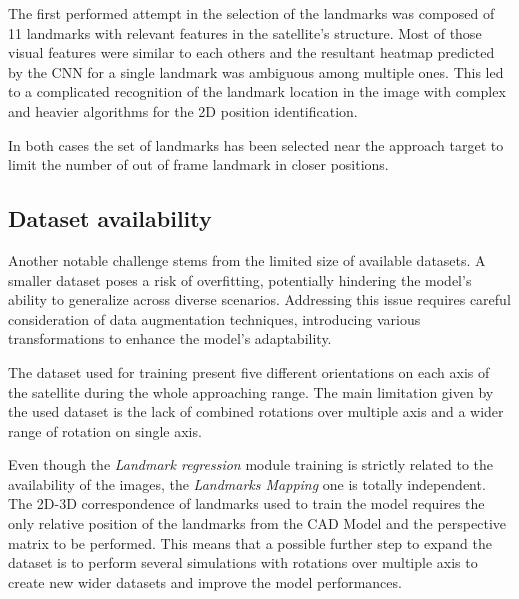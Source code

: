 The first performed attempt in the selection of the landmarks was composed of 11 landmarks with relevant features in the satellite's structure. Most of those visual features were similar to each others and the resultant heatmap predicted by the CNN for a single landmark was ambiguous among multiple ones. This led to a complicated recognition of the landmark location in the image with complex and heavier algorithms for the 2D position identification.

In both cases the set of landmarks has been selected near the approach target to limit the number of out of frame landmark in closer positions.

\subsection{Dataset availability}
\label{Chapter4/DatasetAv}
Another notable challenge stems from the limited size of available datasets. A smaller dataset poses a risk of overfitting, potentially hindering the model's ability to generalize across diverse scenarios. Addressing this issue requires careful consideration of data augmentation techniques, introducing various transformations to enhance the model's adaptability.

The dataset used for training present five different orientations on each axis of the satellite during the whole approaching range. The main limitation given by the used dataset is the lack of combined rotations over multiple axis and a wider range of rotation on single axis.

Even though the \textit{Landmark regression} module training is strictly related to the availability of the images, the \textit{Landmarks Mapping} one is totally independent. The 2D-3D correspondence of landmarks used to train the model requires the only relative position of the landmarks from the CAD Model and the perspective matrix to be performed. This means that a possible further step to expand the dataset is to perform several simulations with rotations over multiple axis to create new wider datasets and improve the model performances.




